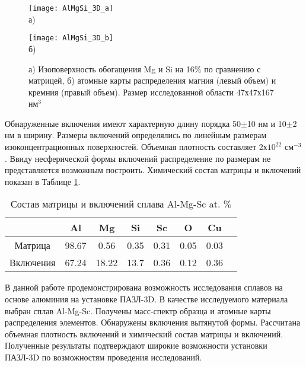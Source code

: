 \begin{figure}[htbp]
	\begin{minipage}[b][][b]{0.49\textwidth}\centering
		\texttt{[image: AlMgSi\_3D\_a]} \\ а)
	\end{minipage}
	\begin{minipage}[b][][b]{0.49\textwidth}\centering
		\texttt{[image: AlMgSi\_3D\_b]} \\ б)
	\end{minipage}
	\caption{а) Изоповерхность обогащения Mg и Si на 16$\%$ по сравнению с матрицей, б) атомные карты распределения магния (левый объем) и кремния (правый объем). Размер исследованной области 47х47х167 нм$^3$}
	\label{fig:AlMgSi_3D}
\end{figure} 

Обнаруженные включения имеют характерную длину порядка 50$\pm$10 нм и 10$\pm$2 нм в ширину. Размеры включений определялись по линейным размерам изоконцентрационных поверхностей. Объемная плотность составляет 2х$10^{22}$ см$^{-3}$. Ввиду несферической формы включений распределение по размерам не представляется возможным построить. Химический состав матрицы и включений показан в Таблице \cref{tab:AlMgSi_table}.

\begin{table} [htbp]
	\centering
		\caption{Состав матрицы и включений сплава Al-Mg-Sc at. $\%$}%
		\label{tab:AlMgSi_table}%
		\begin{SingleSpace}
			\begin{tabular}{| c | c | c | c | c | c | c | c |}
				\hline
				  			& Al      & Mg     & Si    & Sc     & O     & Cu     \\ \hline
				Матрица     & 98.67   & 0.56   & 0.35  & 0.31   & 0.05  & 0.03   \\ \hline
				Включения   & 67.24   & 18.22  & 13.7  & 0.36   & 0.12  & 0.36   \\  \hline				
			\end{tabular}%
		\end{SingleSpace}
\end{table}

В данной работе продемонстрирована возможность исследования сплавов на основе алюминия на установке ПАЗЛ-3D. В качестве исследуемого материала выбран сплав Al-Mg-Sc. Получены масс-спектр образца и атомные карты распределения элементов. Обнаружены включения вытянутой формы. Рассчитана объемная плотность включений и химический состав матрицы и включений. Полученные результаты подтверждают широкие возможности установки ПАЗЛ-3D по возможностям проведения исследований.

